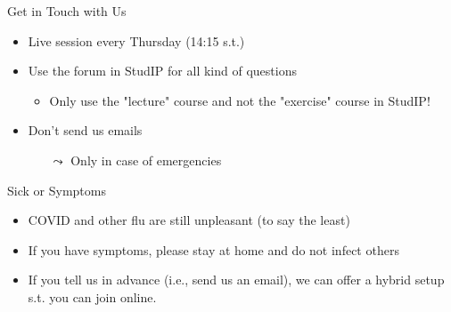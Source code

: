 \documentclass[aspectratio=169, handout]{../latex_main/tntbeamer}  %
\begin{document}
\begin{frame}[c]{Get in Touch with Us}

\begin{itemize}
  \item Live session every Thursday (14:15 s.t.)
  \item \alert{Use the forum in StudIP for all kind of questions}
  \begin{itemize}
      \item Only use the "lecture" course and not the "exercise" course in StudIP!
  \end{itemize}
  \item Don't send us emails
  \begin{itemize}
      \item[$\leadsto$] Only in case of emergencies
  \end{itemize}
\end{itemize}

\end{frame}
\begin{frame}[c]{Sick or Symptoms}

\begin{itemize}
  \item COVID and other flu are still unpleasant (to say the least)
  \item If you have symptoms, please stay at home and do not infect others
  \item If you tell us in advance (i.e., send us an email), we can offer a hybrid setup s.t. you can join online.
\end{itemize}

\end{frame}
\end{document}
